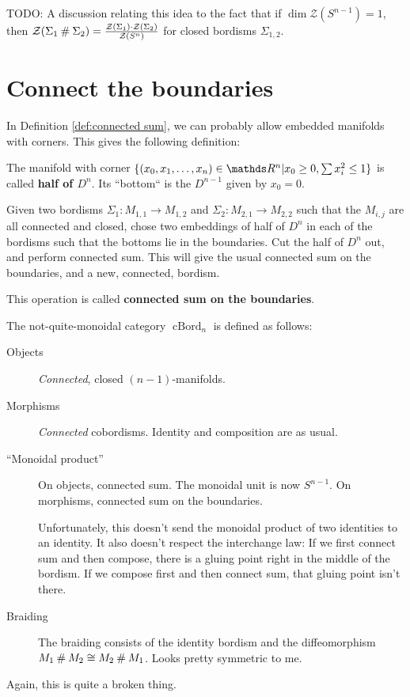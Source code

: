 \documentclass[a4paper]{article}
\begin{document}
\medskip

TODO: A discussion relating this idea to the fact that if $\dim \mathcal{Z}(S^{n-1}) = 1$,
then $\mathcal{Z}(\Sigma_1 \mathbin{\#} \Sigma_2) = \frac{\mathcal{Z}(\Sigma_1) \cdot \mathcal{Z}(\Sigma_2)}{\mathcal{Z}(S^n)}$ for closed bordisms $\Sigma_{1,2}$.

\section{Connect the boundaries}
\label{sec:connect boundaries}

In Definition \ref{def:connected sum},
we can probably allow embedded manifolds with corners.
This gives the following definition:
\begin{definition}
	The manifold with corner $\{(x_0, x_1, \dots, x_n) \in \R^n | x_0 \geq 0, \sum x_i^2 \leq 1 \}$
	is called \textbf{half of $D^n$}.
	Its ``bottom`` is the $D^{n-1}$ given by $x_0 = 0$.

	Given two bordisms $\Sigma_1\colon M_{1,1} \to M_{1,2}$ and $\Sigma_2\colon M_{2,1} \to M_{2,2}$
	such that the $M_{i,j}$ are all connected and closed,
	chose two embeddings of half of $D^n$ in each of the bordisms such that the bottoms lie in the boundaries.
	Cut the half of $D^n$ out,
	and perform connected sum.
	This will give the usual connected sum on the boundaries,
	and a new, connected, bordism.
	
	This operation is called \textbf{connected sum on the boundaries}.
\end{definition}
\begin{definition}
	The not-quite-monoidal category $\operatorname{cBord}_n$ is defined as follows:
	\begin{description}
		\item[Objects]
			\emph{Connected}, closed $(n-1)$-manifolds.
		\item[Morphisms]
			\emph{Connected} cobordisms.
			Identity and composition are as usual.
		\item[``Monoidal product'']
			On objects, connected sum.
			The monoidal unit is now $S^{n-1}$.
			On morphisms, connected sum on the boundaries.
			
			Unfortunately, this doesn't send the monoidal product of two identities to an identity.
			It also doesn't respect the interchange law:
			If we first connect sum and then compose,
			there is a gluing point right in the middle of the bordism.
			If we compose first and then connect sum,
			that gluing point isn't there.
		\item[Braiding]
			The braiding consists of the identity bordism and the diffeomorphism $M_1 \mathbin{\#} M_2 \cong M_2 \mathbin{\#} M_1$.
			Looks pretty symmetric to me.
	\end{description}
\end{definition}
Again, this is quite a broken thing.
\end{document}
